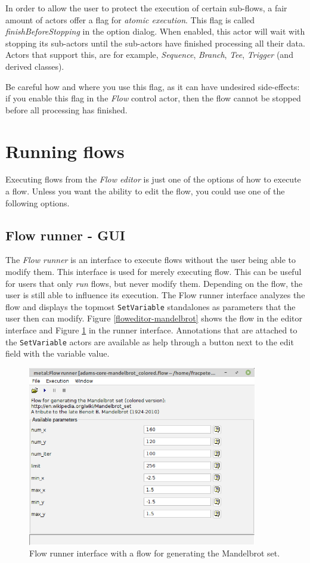 In order to allow the user to protect the execution of certain 
sub-flows, a fair amount of actors offer a flag for \textit{atomic execution}.
This flag is called \textit{finishBeforeStopping} in the option dialog. When 
enabled, this actor will wait with stopping its sub-actors until the sub-actors
have finished processing all their data. Actors that support this, are for 
example, \textit{Sequence}, \textit{Branch}, \textit{Tee}, \textit{Trigger} 
(and derived classes).

Be careful how and where you use this flag, as it can have undesired 
side-effects: if you enable this flag in the \textit{Flow} control actor, then 
the flow cannot be stopped before all processing has finished.

\newpage
\section{Running flows}
\label{running_flows}
Executing flows from the \textit{Flow editor} is just one of the options of
how to execute a flow. Unless you want the ability to edit the flow, you could 
use one of the following options.

\subsection{Flow runner - GUI}
The \textit{Flow runner} is an interface to execute flows without the user
being able to modify them. This interface is used for merely executing flow.
This can be useful for users that only \textit{run} flows, but never modify
them. Depending on the flow, the user is still able to influence its 
execution. The Flow runner interface analyzes the flow and displays the 
topmost \texttt{SetVariable} standalones as parameters that the user then
can modify. Figure \ref{floweditor-mandelbrot} shows the flow in the editor
interface and Figure \ref{flowrunner-mandelbrot} in the runner interface.
Annotations that are attached to the \texttt{SetVariable} actors are available
as help through a button next to the edit field with the variable value.

\begin{figure}[htb]
  \centering
  \includegraphics[width=10.0cm]{images/flowrunner-mandelbrot.png}
  \caption{Flow runner interface with a flow for generating the Mandelbrot set.}
  \label{flowrunner-mandelbrot}
\end{figure}

